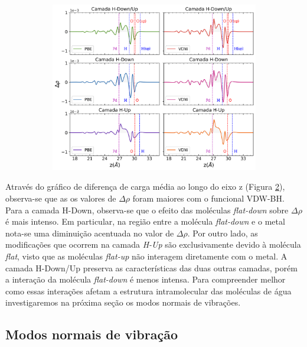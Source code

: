 \begin{figure}[H]
\begin{subfigure}{0.8\textwidth}
		\includegraphics[width=\textwidth]{figs/pd_camada_z.png}
		\label{fig:camada_z}
	\end{subfigure}
\end{figure}


Através do gráfico de diferença de carga média ao longo do eixo z (Figura \ref{fig:camada_z}), observa-se que as os valores de $ \Delta\rho $ foram maiores com o funcional VDW-BH. Para a camada H-Down, observa-se que o efeito das moléculas \textit{flat-down} sobre $ \Delta\rho $ é mais intenso. Em particular, na região entre a molécula \textit{flat-down} e o metal nota-se uma diminuição acentuada no valor de $ \Delta \rho $. Por outro lado, as modificações que ocorrem na camada \textit{H-Up} são exclusivamente devido à molécula \textit{flat}, visto que as moléculas \textit{flat-up} não interagem diretamente com o metal. A camada H-Down/Up preserva as características das duas outras camadas, porém a interação da molécula \textit{flat-down} é menos intensa. Para compreender melhor como essas interações afetam a estrutura intramolecular das moléculas de água investigaremos na próxima seção os modos normais de vibrações. 


\subsection*{Modos normais de vibração}

